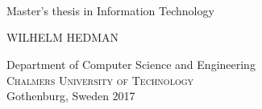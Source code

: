 
\begin{titlepage}
			
\addtolength{\voffset}{2cm}

\begin{figure}[H]
\centering
\vspace{2cm}	%
\end{figure}

\mbox{}
\vfill
\renewcommand{\familydefault}{\sfdefault} \normalfont %
\textbf{{\Huge 	\toptitle 	\\[0.2cm] 
				\bottomtitle}} 	\\[0.5cm]
{\Large \subt}\\[0.5cm]
Master's thesis in Information Technology \setlength{\parskip}{1cm}

{\Large WILHELM HEDMAN} \setlength{\parskip}{2.9cm}

Department of Computer Science and Engineering \\
\textsc{Chalmers University of Technology} \\
Gothenburg, Sweden 2017

\renewcommand{\familydefault}{\rmdefault} \normalfont %
\end{titlepage}


\newpage
\restoregeometry
\thispagestyle{empty}
\mbox{}


